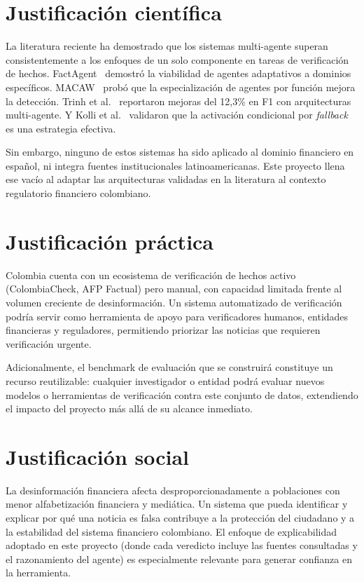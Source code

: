 \section{Justificación científica}

La literatura reciente ha demostrado que los sistemas multi-agente superan consistentemente a los enfoques de un solo componente en tareas de verificación de hechos. FactAgent~\cite{Li2024} demostró la viabilidad de agentes adaptativos a dominios específicos. MACAW~\cite{Wu2024} probó que la especialización de agentes por función mejora la detección. Trinh et al.~\cite{Trinh2025} reportaron mejoras del 12,3\% en F1 con arquitecturas multi-agente. Y Kolli et al.~\cite{Kolli2025} validaron que la activación condicional por \textit{fallback} es una estrategia efectiva.

Sin embargo, ninguno de estos sistemas ha sido aplicado al dominio financiero en español, ni integra fuentes institucionales latinoamericanas. Este proyecto llena ese vacío al adaptar las arquitecturas validadas en la literatura al contexto regulatorio financiero colombiano.

\section{Justificación práctica}

Colombia cuenta con un ecosistema de verificación de hechos activo (ColombiaCheck, AFP Factual) pero manual, con capacidad limitada frente al volumen creciente de desinformación. Un sistema automatizado de verificación podría servir como herramienta de apoyo para verificadores humanos, entidades financieras y reguladores, permitiendo priorizar las noticias que requieren verificación urgente.

Adicionalmente, el benchmark de evaluación que se construirá constituye un recurso reutilizable: cualquier investigador o entidad podrá evaluar nuevos modelos o herramientas de verificación contra este conjunto de datos, extendiendo el impacto del proyecto más allá de su alcance inmediato.

\section{Justificación social}

La desinformación financiera afecta desproporcionadamente a poblaciones con menor alfabetización financiera y mediática. Un sistema que pueda identificar y explicar por qué una noticia es falsa contribuye a la protección del ciudadano y a la estabilidad del sistema financiero colombiano. El enfoque de explicabilidad adoptado en este proyecto (donde cada veredicto incluye las fuentes consultadas y el razonamiento del agente) es especialmente relevante para generar confianza en la herramienta.

